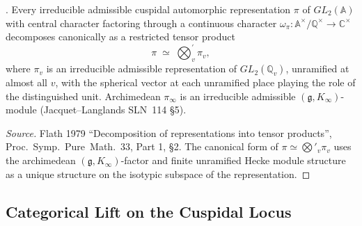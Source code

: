 \begin{theorem}
\label{v4-arith:w5-e:thm:Flath}
\ClaimStatusProvedElsewhere. Every irreducible admissible
cuspidal automorphic representation \(\pi\) of
\(GL_{2}(\mathbb{A})\) with central character factoring through a
continuous character \(\omega_{\pi}\colon\mathbb{A}^{\times}/\mathbb{Q}^{\times}\to\mathbb{C}^{\times}\)
decomposes canonically as a restricted tensor product
\[
\pi\;\simeq\;\bigotimes_{v}^{\prime}\pi_{v},
\]
where \(\pi_{v}\) is an irreducible admissible representation of
\(GL_{2}(\mathbb{Q}_{v})\), unramified at almost all \(v\), with the
spherical vector at each unramified place playing the role of the
distinguished unit. Archimedean \(\pi_{\infty}\) is an irreducible
admissible \((\mathfrak{g},K_{\infty})\)-module (Jacquet--Langlands
SLN~114 \S 5).
\end{theorem}

\begin{proof}[Source]
Flath 1979 ``Decomposition of representations into tensor
products'', Proc.~Symp.~Pure~Math.~33, Part 1, \S 2. The canonical
form of \(\pi\simeq\bigotimes'_{v}\pi_{v}\) uses the archimedean
\((\mathfrak{g},K_{\infty})\)-factor and finite unramified Hecke
module structure as a unique structure on the isotypic subspace of
the representation.
\end{proof}

\subsection{Categorical Lift on the Cuspidal Locus}

